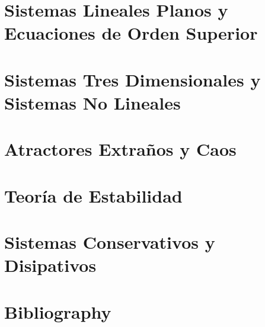 \documentclass[10pt]{book} %
\begin{document}
\chapter{Sistemas Lineales Planos y Ecuaciones de Orden Superior}


\chapter{Sistemas Tres Dimensionales y Sistemas No Lineales}

\chapter{Atractores Extra\~nos y Caos}

\chapter{Teor\'ia de Estabilidad}

\chapter{Sistemas Conservativos y Disipativos}




\chapter*{Bibliography}


\cleardoublepage

\end{document}
